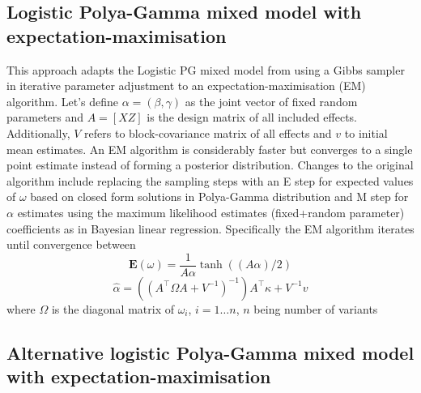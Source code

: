 \documentclass [12pt,a4paper]{report}
\begin{document}
\vline
\subsection*{Logistic Polya-Gamma mixed model with expectation-maximisation}

This approach adapts the Logistic PG mixed model  from using a Gibbs sampler in iterative parameter adjustment to an expectation-maximisation (EM) algorithm. Let's define $\alpha=(\beta,\gamma)$ as the joint vector of fixed random parameters and $A=[XZ]$ is the design matrix of all included effects. Additionally, $V$ refers to block-covariance matrix of all effects and $v$ to initial mean estimates. An EM algorithm is considerably faster but converges to a single point estimate instead of forming a posterior distribution.  Changes to the original algorithm include replacing the sampling steps with an E step for expected values of $\omega$ based on closed form solutions in Polya-Gamma distribution and M step for $\alpha$ estimates using the maximum likelihood estimates (fixed+random parameter) coefficients as in Bayesian linear regression. Specifically the EM algorithm iterates until convergence between \[\mathbf{E}(\omega)=\frac{1}{A\alpha}\tanh((A\alpha)/2)\] 
 \[ \hat{\alpha}=((A^{\intercal} \Omega A + V^{-1})^{-1}) A^{\intercal}\kappa+V^{-1}v  \] where $\Omega$ is the diagonal matrix of $\omega_i$, $ i=1 \ldots n$, $n$ being number of variants \par 
 

\subsection*{Alternative logistic Polya-Gamma mixed model with expectation-maximisation}
\end{document}
